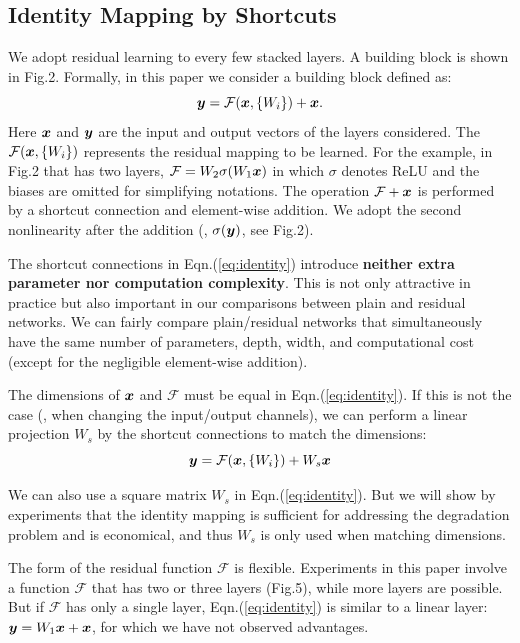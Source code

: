 \subsection{Identity Mapping by Shortcuts}
We adopt residual learning to every few stacked layers.
A building block is shown in Fig.2. Formally, in this paper we consider a building block defined as:
\begin{equation}\label{eq:identity}
    \boldsymbol{y} = \mathcal{F}(\boldsymbol{x},\{W_{i}\}) + \boldsymbol{x}.
\end{equation}
Here $\boldsymbol{x}$ and $\boldsymbol{y}$ are the input and output vectors of the layers considered. The $\mathcal{F}(\boldsymbol{x},\{W_{i}\})$ represents the residual mapping to be learned. For the example, in Fig.2 that has two layers, $\mathcal{F}=W_{2}\sigma(W_{1}\boldsymbol{x})$ in which $\sigma$ denotes ReLU and the biases are omitted for simplifying notations. The operation $\mathcal{F}+\boldsymbol{x}$ is performed by a shortcut connection and element-wise addition. We adopt the second nonlinearity after the addition (\ie, $\sigma(\boldsymbol{y})$, see Fig.2).

The shortcut connections in Eqn.(\ref{eq:identity}) introduce \textbf{neither extra parameter nor computation complexity}. This is not only attractive in practice but also important in our comparisons between plain and residual networks. We can fairly compare plain/residual networks that simultaneously have the same number of parameters, depth, width, and computational cost (except for the negligible element-wise addition).

The dimensions of $\boldsymbol{x}$ and $\mathcal{F}$ must be equal in Eqn.(\ref{eq:identity}). If this is not the case (\eg, when changing the input/output channels), we can perform a linear projection $W_{s}$ by the shortcut connections to match the dimensions:
\begin{equation}\label{eq:transform}
    \boldsymbol{y} = \mathcal{F}(\boldsymbol{x},\{W_{i}\}) + W_{s}\boldsymbol{x}
\end{equation}

We can also use a square matrix $W_{s}$ in Eqn.(\ref{eq:identity}). But we will show by experiments that the identity mapping is sufficient for addressing the degradation problem and is economical, and thus $W_{s}$ is only used when matching dimensions.

The form of the residual function $\mathcal{F}$ is flexible. Experiments in this paper involve a function $\mathcal{F}$ that has two or three layers (Fig.5), while more layers are possible. But if $\mathcal{F}$ has only a single layer, Eqn.(\ref{eq:identity}) is similar to a linear layer: $\boldsymbol{y}=W_1\boldsymbol{x}+\boldsymbol{x}$, for which we have not observed advantages.


